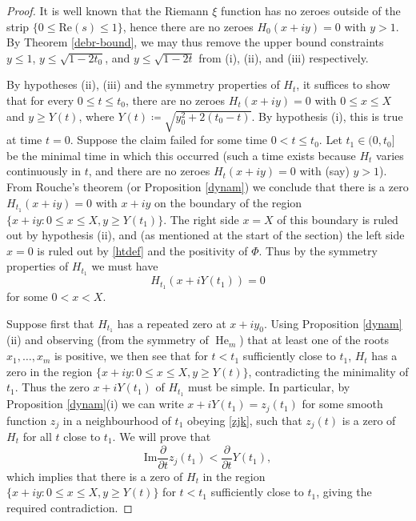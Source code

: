\documentclass[a4paper,11pt,twoside]{amsart}
\begin{document}
\begin{proof}  It is well known that the Riemann $\xi$ function has no zeroes outside of the strip $\{ 0 \leq \mathrm{Re}(s) \leq 1 \}$, hence there are no zeroes $H_0(x+iy)=0$ with $y > 1$.  By Theorem \ref{debr-bound}, we may thus remove the upper bound constraints $y \leq 1$, $y \leq \sqrt{1-2t_0}$, and $y \leq \sqrt{1-2t}$ from (i), (ii), and (iii) respectively.

By hypotheses (ii), (iii) and the symmetry properties of $H_t$, it suffices to show that for every $0 \leq t \leq t_0$, there are no zeroes $H_t(x+iy) = 0$ with $0 \leq x \leq X$ and $y \geq Y(t)$, where $Y(t) \coloneqq \sqrt{y_0^2 + 2(t_0-t)}$.  By hypothesis (i), this is true at time $t=0$.  Suppose the claim failed for some time $0 < t \leq t_0$.  Let $t_1 \in (0,t_0]$ be the minimal time in which this occurred (such a time exists because $H_t$ varies continuously in $t$, and there are no zeroes $H_t(x+iy)=0$ with (say) $y>1$).  From Rouche's theorem (or Proposition \ref{dynam}) we conclude that there is a zero $H_{t_1}(x+iy)=0$ with $x+iy$ on the boundary of the region $\{ x+iy: 0 \leq	 x \leq X, y \geq Y(t_1) \}$.  The right side $x=X$ of this boundary is ruled out by hypothesis (ii), and (as mentioned at the start of the section) the left side $x=0$ is ruled out by \eqref{htdef} and the positivity of $\Phi$.  Thus by the symmetry properties of $H_{t_1}$ we must have
$$ H_{t_1}(x+iY(t_1)) = 0$$
for some $0 < x < X$.

Suppose first that $H_{t_1}$ has a repeated zero at $x+iy_0$.  Using Proposition \ref{dynam}(ii) and observing (from the symmetry of $\operatorname{He}_m$) that at least one of the roots $x_1,\dots,x_m$ is positive, we then see that for $t<t_1$ sufficiently close to $t_1$, $H_t$ has a zero in the region $\{ x+iy: 0 \leq x \leq X, y \geq Y(t) \}$, contradicting the minimality of $t_1$.  Thus the zero $x+i Y(t_1)$ of $H_{t_1}$ must be simple.  In particular, by Proposition \ref{dynam}(i) we can write $x+i Y(t_1) = z_j(t_1)$ for some smooth function $z_j$ in a neighbourhood of $t_1$ obeying \eqref{zjk}, such that $z_j(t)$ is a zero of $H_t$ for all $t$ close to $t_1$.  We will prove that
\begin{equation}\label{im}
\mathrm{Im} \frac{\partial}{\partial t} z_j( t_1 ) < \frac{\partial}{\partial t} Y(t_1),
\end{equation}
which implies that there is a zero of $H_t$ in the region $\{ x+iy: 0 \leq x \leq X, y \geq Y(t) \}$  for $t<t_1$ sufficiently close to $t_1$, giving the required contradiction.  


\end{proof}
\end{document}

